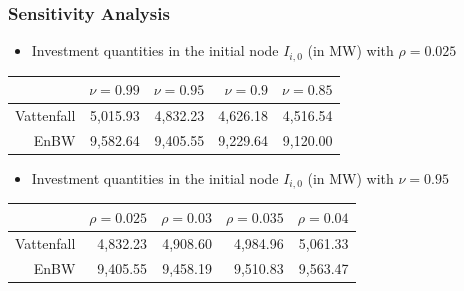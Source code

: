 \begin{frame}
  \frametitle{Sensitivity Analysis}

  \begin{itemize}
  \item Investment quantities in the initial node $I_{i,0}$ (in MW) with $\rho=0.025$
  \end{itemize}

\begin{center}
  \begin{tabular}{rrrrr}
\hline
           &       $\nu=0.99$ &       $\nu=0.95$ &        $\nu=0.9$ &       $\nu=0.85$ \\
\hline\hline
 Vattenfall  &      5,015.93  &      4,832.23  &      4,626.18  &      4,516.54  \\

     EnBW  &      9,582.64  &      9,405.55  &      9,229.64  &      9,120.00  \\
\hline
\end{tabular}
\end{center}

\begin{itemize}
\item Investment quantities in the initial node $I_{i,0}$ (in MW) with $\nu=0.95$
\end{itemize}

\begin{center}
  \begin{tabular}{rrrrr}
\hline
           &      $\rho=0.025$ &       $\rho=0.03$ &      $\rho=0.035$ &       $\rho=0.04$ \\
\hline\hline
Vattenfall &      4,832.23  &      4,908.60  &      4,984.96  &      5,061.33  \\

      EnBW &      9,405.55  &      9,458.19  &      9,510.83  &      9,563.47  \\
\hline
\end{tabular}  
\end{center}

\end{frame}